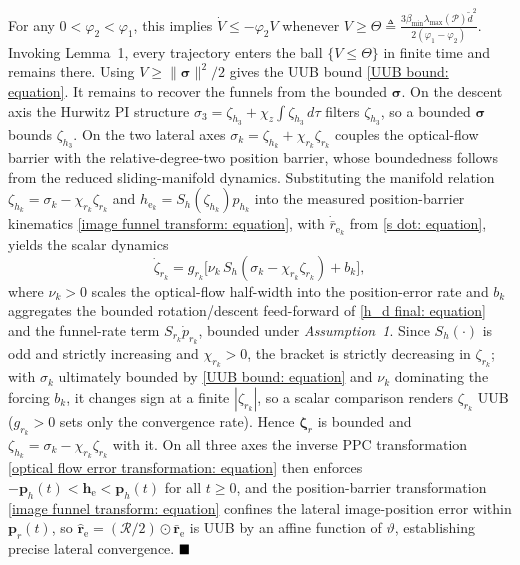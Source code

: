 \documentclass{IEEEtaes}
\begin{document}
For any $0<\varphi_2<\varphi_1$, this implies $\dot{V}\le-\varphi_2 V$ whenever $V\ge\Theta\triangleq \tfrac{3\beta_{\min}\lambda_{\max}(\mathcal{P})\tilde{d}^2}{2(\varphi_1-\varphi_2)}$. Invoking Lemma~1, every trajectory enters the ball $\{V\le\Theta\}$ in finite time and remains there. Using $V\ge\|\boldsymbol{\sigma}\|^2/2$ gives the UUB bound \eqref{UUB bound: equation}. It remains to recover the funnels from the bounded $\boldsymbol{\sigma}$. On the descent axis the Hurwitz PI structure $\sigma_3=\zeta_{h_3}+\chi_z\!\int\zeta_{h_3}\,d\tau$ filters $\zeta_{h_3}$, so a bounded $\boldsymbol{\sigma}$ bounds $\zeta_{h_3}$. On the two lateral axes $\sigma_k=\zeta_{h_k}+\chi_{r_k}\zeta_{r_k}$ couples the optical-flow barrier with the relative-degree-two position barrier, whose boundedness follows from the reduced sliding-manifold dynamics. Substituting the manifold relation $\zeta_{h_k}=\sigma_k-\chi_{r_k}\zeta_{r_k}$ and $h_{\text{e}_k}=S_h(\zeta_{h_k})p_{h_k}$ into the measured position-barrier kinematics \eqref{image funnel transform: equation}, with $\dot{\bar{r}}_{\text{e}_k}$ from \eqref{s dot: equation}, yields the scalar dynamics
\begin{equation*}
    \dot{\zeta}_{r_k}=g_{r_k}\big[\nu_k\,S_h(\sigma_k-\chi_{r_k}\zeta_{r_k})+b_k\big],
\end{equation*}
where $\nu_k>0$ scales the optical-flow half-width into the position-error rate and $b_k$ aggregates the bounded rotation/descent feed-forward of \eqref{h_d final: equation} and the funnel-rate term $S_{r_k}\dot{p}_{r_k}$, bounded under \textit{Assumption~1}. Since $S_h(\cdot)$ is odd and strictly increasing and $\chi_{r_k}>0$, the bracket is strictly decreasing in $\zeta_{r_k}$; with $\sigma_k$ ultimately bounded by \eqref{UUB bound: equation} and $\nu_k$ dominating the forcing $b_k$, it changes sign at a finite $|\zeta_{r_k}|$, so a scalar comparison renders $\zeta_{r_k}$ UUB ($g_{r_k}>0$ sets only the convergence rate). Hence $\boldsymbol{\zeta}_r$ is bounded and $\zeta_{h_k}=\sigma_k-\chi_{r_k}\zeta_{r_k}$ with it. On all three axes the inverse PPC transformation \eqref{optical flow error transformation: equation} then enforces $-\boldsymbol{p}_h(t)<\boldsymbol{h}_\text{e}<\boldsymbol{p}_h(t)$ for all $t\ge 0$, and the position-barrier transformation \eqref{image funnel transform: equation} confines the lateral image-position error within $\boldsymbol{p}_r(t)$, so $\hat{\boldsymbol{r}}_\text{e}=(\mathcal{R}/2)\odot\bar{\boldsymbol{r}}_\text{e}$ is UUB by an affine function of $\vartheta$, establishing precise lateral convergence. $\hfill\blacksquare$
\end{document}
